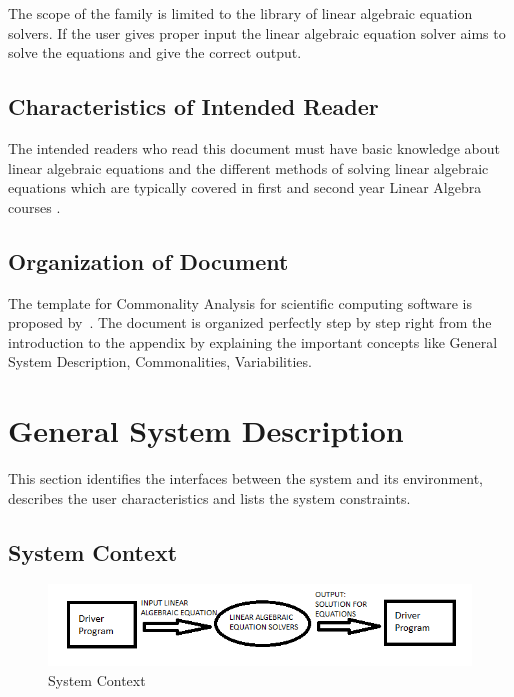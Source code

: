 \documentclass[12pt]{article}
\begin{document}
The scope of the family is limited to the library of linear algebraic equation
solvers. If the user gives proper input the linear algebraic equation solver
aims to solve the equations and give the correct output.

\subsection{Characteristics of Intended Reader} 

The intended readers who read this document must have basic knowledge about
linear algebraic equations and the different methods of solving linear algebraic
equations which are typically covered in first and second year Linear Algebra courses .


\subsection{Organization of Document}

The template for Commonality Analysis for scientific computing software is
proposed by~\cite{smith2006systematic}. The document is organized perfectly step
by step right from the introduction to the appendix by explaining the important
concepts like General System Description, Commonalities, Variabilities.

\section{General System Description}

This section identifies the interfaces between the system and its environment,
describes the user characteristics and lists the system constraints.

\subsection{System Context}

\begin{figure}[h]
\centering
\includegraphics[scale= .7]{diagram1}
\caption{System Context}
\end{figure}
\end{document}
